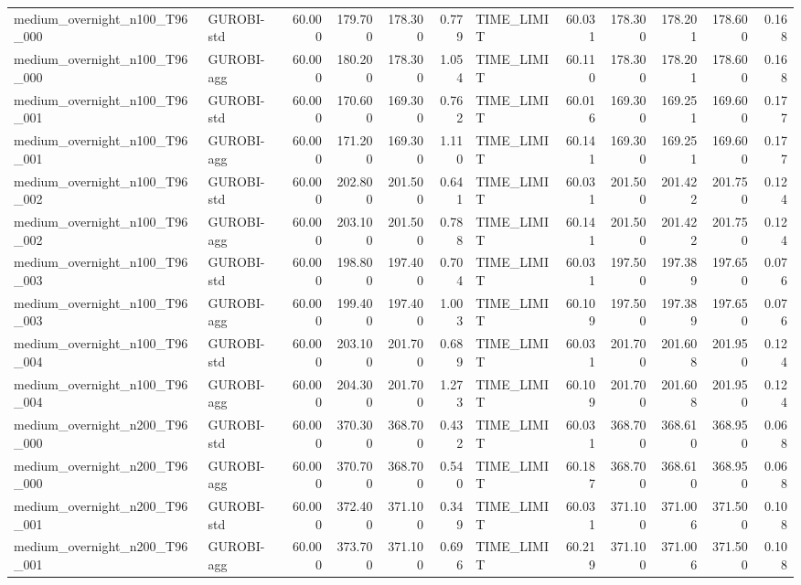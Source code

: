 \begin{table}[htbp]
\begin{tabular}{llrrrrlrrrrr}
medium\_overnight\_n100\_T96\_000 & GUROBI-std & 60.000 & 179.700 & 178.300 & 0.779 & TIME\_LIMIT & 60.031 & 178.300 & 178.201 & 178.600 & 0.168 \\
medium\_overnight\_n100\_T96\_000 & GUROBI-agg & 60.000 & 180.200 & 178.300 & 1.054 & TIME\_LIMIT & 60.110 & 178.300 & 178.201 & 178.600 & 0.168 \\
medium\_overnight\_n100\_T96\_001 & GUROBI-std & 60.000 & 170.600 & 169.300 & 0.762 & TIME\_LIMIT & 60.016 & 169.300 & 169.251 & 169.600 & 0.177 \\
medium\_overnight\_n100\_T96\_001 & GUROBI-agg & 60.000 & 171.200 & 169.300 & 1.110 & TIME\_LIMIT & 60.141 & 169.300 & 169.251 & 169.600 & 0.177 \\
medium\_overnight\_n100\_T96\_002 & GUROBI-std & 60.000 & 202.800 & 201.500 & 0.641 & TIME\_LIMIT & 60.031 & 201.500 & 201.422 & 201.750 & 0.124 \\
medium\_overnight\_n100\_T96\_002 & GUROBI-agg & 60.000 & 203.100 & 201.500 & 0.788 & TIME\_LIMIT & 60.141 & 201.500 & 201.422 & 201.750 & 0.124 \\
medium\_overnight\_n100\_T96\_003 & GUROBI-std & 60.000 & 198.800 & 197.400 & 0.704 & TIME\_LIMIT & 60.031 & 197.500 & 197.389 & 197.650 & 0.076 \\
medium\_overnight\_n100\_T96\_003 & GUROBI-agg & 60.000 & 199.400 & 197.400 & 1.003 & TIME\_LIMIT & 60.109 & 197.500 & 197.389 & 197.650 & 0.076 \\
medium\_overnight\_n100\_T96\_004 & GUROBI-std & 60.000 & 203.100 & 201.700 & 0.689 & TIME\_LIMIT & 60.031 & 201.700 & 201.608 & 201.950 & 0.124 \\
medium\_overnight\_n100\_T96\_004 & GUROBI-agg & 60.000 & 204.300 & 201.700 & 1.273 & TIME\_LIMIT & 60.109 & 201.700 & 201.608 & 201.950 & 0.124 \\
medium\_overnight\_n200\_T96\_000 & GUROBI-std & 60.000 & 370.300 & 368.700 & 0.432 & TIME\_LIMIT & 60.031 & 368.700 & 368.610 & 368.950 & 0.068 \\
medium\_overnight\_n200\_T96\_000 & GUROBI-agg & 60.000 & 370.700 & 368.700 & 0.540 & TIME\_LIMIT & 60.187 & 368.700 & 368.610 & 368.950 & 0.068 \\
medium\_overnight\_n200\_T96\_001 & GUROBI-std & 60.000 & 372.400 & 371.100 & 0.349 & TIME\_LIMIT & 60.031 & 371.100 & 371.006 & 371.500 & 0.108 \\
medium\_overnight\_n200\_T96\_001 & GUROBI-agg & 60.000 & 373.700 & 371.100 & 0.696 & TIME\_LIMIT & 60.219 & 371.100 & 371.006 & 371.500 & 0.108 \\

\end{tabular}
\end{table}
